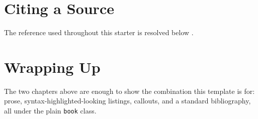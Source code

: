 \documentclass[11pt]{book}
\begin{document}
\section{Citing a Source}

The reference used throughout this starter is resolved below
\citep{knuth1984texbook}.

\section{Wrapping Up}

The two chapters above are enough to show the combination this template is
for: prose, syntax-highlighted-looking listings, callouts, and a standard
bibliography, all under the plain \texttt{book} class.



\end{document}
